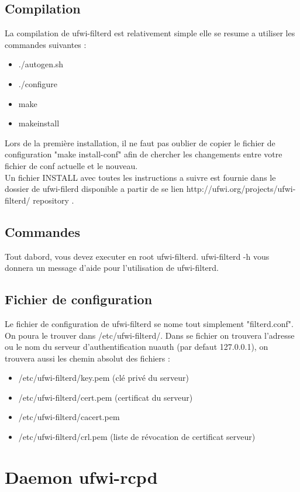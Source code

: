 \documentclass[12pt]{report}
\begin{document}
\begin{itemize}
\section{Compilation}
La compilation de ufwi-filterd est relativement simple elle se resume a utiliser les commandes suivantes :
\begin{itemize}
  \item ./autogen.sh
  \item ./configure
  \item make
  \item makeinstall
\end{itemize}
Lors de la première installation, il ne faut pas oublier de copier le fichier de configuration "make install-conf" afin de chercher les changements entre votre fichier de conf actuelle et le nouveau.\\
Un fichier INSTALL avec toutes les instructions a suivre est fournie dans le dossier de ufwi-filerd disponible a partir de se lien http://ufwi.org/projects/ufwi-filterd/ repository .
\section{Commandes}
Tout dabord, vous devez executer en root ufwi-filterd.
ufwi-filterd -h vous donnera un message d'aide pour l'utilisation de ufwi-filterd.
\section{Fichier de configuration}
Le fichier de configuration de ufwi-filterd se nome tout simplement "filterd.conf". On poura le trouver dans /etc/ufwi-filterd/.
Dans se fichier on trouvera l'adresse ou le nom du serveur d'authentification nuauth (par defaut 127.0.0.1), on trouvera aussi les chemin absolut des fichiers :
\begin{itemize}
  \item /etc/ufwi-filterd/key.pem (clé privé du serveur)
  \item /etc/ufwi-filterd/cert.pem (certificat du serveur)
  \item /etc/ufwi-filterd/cacert.pem
  \item /etc/ufwi-filterd/crl.pem (liste de révocation de certificat serveur)
\end{itemize}

\chapter{Daemon ufwi-rcpd}

\end{itemize}
\end{document}
